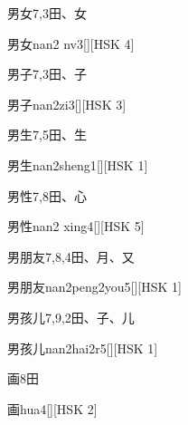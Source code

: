 \begin{entry}{男女}{7,3}{⽥、⼥}
  \begin{phonetics}{男女}{nan2 nv3}[][HSK 4]
  \end{phonetics}
\end{entry}

\begin{entry}{男子}{7,3}{⽥、⼦}
  \begin{phonetics}{男子}{nan2zi3}[][HSK 3]
  \end{phonetics}
\end{entry}

\begin{entry}{男生}{7,5}{⽥、⽣}
  \begin{phonetics}{男生}{nan2sheng1}[][HSK 1]
  \end{phonetics}
\end{entry}

\begin{entry}{男性}{7,8}{⽥、⼼}
  \begin{phonetics}{男性}{nan2 xing4}[][HSK 5]
  \end{phonetics}
\end{entry}

\begin{entry}{男朋友}{7,8,4}{⽥、⽉、⼜}
  \begin{phonetics}{男朋友}{nan2peng2you5}[][HSK 1]
  \end{phonetics}
\end{entry}

\begin{entry}{男孩儿}{7,9,2}{⽥、⼦、⼉}
  \begin{phonetics}{男孩儿}{nan2hai2r5}[][HSK 1]
  \end{phonetics}
\end{entry}

\begin{entry}{画}{8}{⽥}
  \begin{phonetics}{画}{hua4}[][HSK 2]
  \end{phonetics}
\end{entry}


